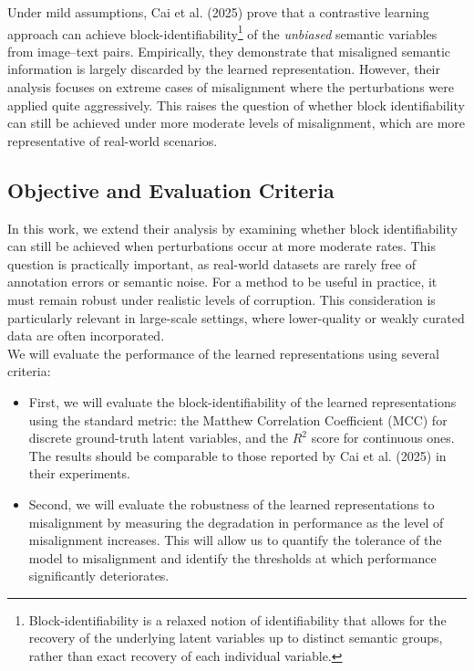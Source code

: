 \documentclass[a4paper,12pt]{article}
\begin{document}
Under mild assumptions, Cai et al. (2025) prove that a contrastive learning approach can achieve block-identifiability\footnote{Block-identifiability is a relaxed notion of identifiability that allows for the recovery of the underlying latent variables up to distinct semantic groups, rather than exact recovery of each individual variable.} of the \textit{unbiased} semantic variables from image–text pairs. Empirically, they demonstrate that misaligned semantic information is largely discarded by the learned representation. However, their analysis focuses on extreme cases of misalignment where the perturbations were applied quite aggressively. This raises the question of whether block identifiability can still be achieved under more moderate levels of misalignment, which are more representative of real-world scenarios.



\subsection*{Objective and Evaluation Criteria}

In this work, we extend their analysis by examining whether block identifiability can still be achieved when perturbations occur at more moderate rates. This question is practically important, as real-world datasets are rarely free of annotation errors or semantic noise. For a method to be useful in practice, it must remain robust under realistic levels of corruption. This consideration is particularly relevant in large-scale settings, where lower-quality or weakly curated data are often incorporated. \\

We will evaluate the performance of the learned representations using several criteria:
\begin{itemize}
  \item First, we will evaluate the block-identifiability of the learned representations using the standard metric: the Matthew Correlation Coefficient (MCC) for discrete ground-truth latent variables, and the $R^2$ score for continuous ones. The results should be comparable to those reported by Cai et al. (2025) in their experiments.
  \item Second, we will evaluate the robustness of the learned representations to misalignment by measuring the degradation in performance as the level of misalignment increases. This will allow us to quantify the tolerance of the model to misalignment and identify the thresholds at which performance significantly deteriorates.
\end{itemize}
\end{document}
